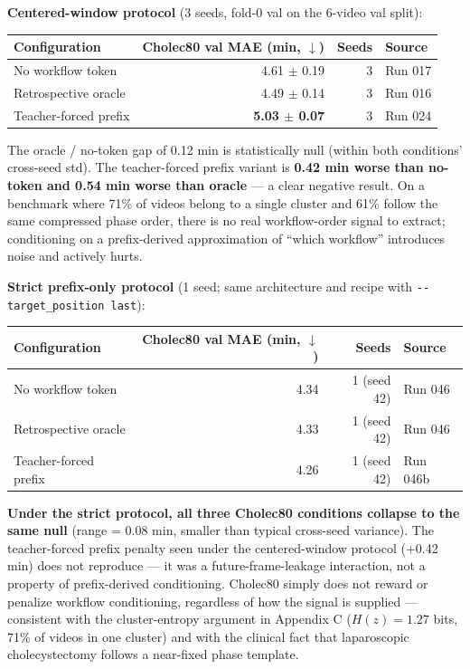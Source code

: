 \textbf{Centered-window protocol} (3 seeds, fold-0 val on the 6-video
val split):

\begin{longtable}[]{@{}lrrl@{}}
\toprule\noalign{}
Configuration & Cholec80 val MAE (min, $\downarrow$) & Seeds & Source \\
\midrule\noalign{}
\endhead
\bottomrule\noalign{}
\endlastfoot
No workflow token & 4.61 $\pm$ 0.19 & 3 & Run 017 \\
Retrospective oracle & 4.49 $\pm$ 0.14 & 3 & Run 016 \\
Teacher-forced prefix & \textbf{5.03 $\pm$ 0.07} & 3 & Run 024 \\
\end{longtable}

The oracle / no-token gap of 0.12 min is statistically null (within both
conditions' cross-seed std). The teacher-forced prefix variant is
\textbf{0.42 min worse than no-token and 0.54 min worse than oracle} ---
a clear negative result. On a benchmark where 71\% of videos belong to a
single cluster and 61\% follow the same compressed phase order, there is
no real workflow-order signal to extract; conditioning on a
prefix-derived approximation of ``which workflow'' introduces noise and
actively hurts.

\textbf{Strict prefix-only protocol} (1 seed; same architecture and
recipe with \texttt{-\/-target\_position\ last}):

\begin{longtable}[]{@{}lrrl@{}}
\toprule\noalign{}
Configuration & Cholec80 val MAE (min, $\downarrow$) & Seeds & Source \\
\midrule\noalign{}
\endhead
\bottomrule\noalign{}
\endlastfoot
No workflow token & 4.34 & 1 (seed 42) & Run 046 \\
Retrospective oracle & 4.33 & 1 (seed 42) & Run 046 \\
Teacher-forced prefix & 4.26 & 1 (seed 42) & Run 046b \\
\end{longtable}

\textbf{Under the strict protocol, all three Cholec80 conditions
collapse to the same null} (range = 0.08 min, smaller than typical
cross-seed variance). The teacher-forced prefix penalty seen under the
centered-window protocol (+0.42 min) does not reproduce — it was a
future-frame-leakage interaction, not a property of prefix-derived
conditioning. Cholec80 simply does not reward or penalize workflow
conditioning, regardless of how the signal is supplied — consistent
with the cluster-entropy argument in Appendix C ($H(z) = 1.27$ bits,
71\% of videos in one cluster) and with the clinical fact that
laparoscopic cholecystectomy follows a near-fixed phase template.

